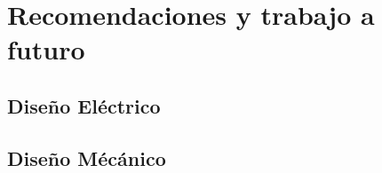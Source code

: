 \chapter{Recomendaciones y trabajo a futuro }

\section{Diseño Eléctrico}

\section{Diseño Mécánico}


